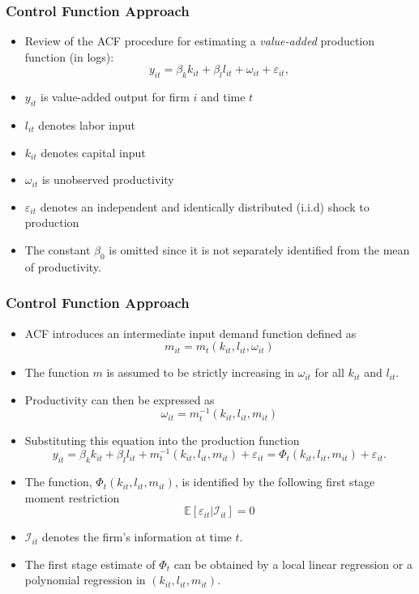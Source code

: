 \documentclass[xcolor={dvipsnames}, notheorems]{beamer}
\theoremstyle{plain}
\begin{document}

\begin{frame}
\frametitle{Control Function Approach}
\begin{itemize}
\item Review of the ACF procedure for estimating a \textit{value-added} production function (in logs):
\begin{equation}
y_{it}=\beta_{k}k_{it}+\beta_{l}l_{it}+\omega_{it}+\varepsilon_{it},
\end{equation}
\item $y_{it}$ is value-added output for firm $i$ and time $t$
\item $l_{it}$ denotes labor input
\item $k_{it}$ denotes capital input
\item $\omega_{it}$ is unobserved productivity
\item $\varepsilon_{it}$ denotes an independent and identically distributed (i.i.d)  shock to production
\item The constant $\beta_{0}$ is omitted since it is not separately identified from the mean of productivity.  
\end{itemize}
\end{frame}
\begin{frame}
\frametitle{Control Function Approach}
\begin{itemize}
\item ACF introduces an intermediate input demand function defined as
\begin{equation}
m_{it}=m_{t}(k_{it}, l_{it}, \omega_{it})
\end{equation} 
\item The function $m$ is assumed to be strictly increasing in $\omega_{it}$ for all $k_{it}$ and $l_{it}$. 
\item Productivity can then be expressed as
\begin{equation}
\omega_{it}=m_{t}^{-1}(k_{it}, l_{it}, m_{it})
\end{equation}
\item Substituting this equation into the production function
\begin{equation}
y_{it}=\beta_{k}k_{it}+\beta_{l}l_{it}+m^{-1}_{t}(k_{it}, l_{it}, m_{it})+\varepsilon_{it}=\Phi_{t}(k_{it}, l_{it}, m_{it})+\varepsilon_{it}.
\end{equation}
\item The function, $\Phi_{t}(k_{it}, l_{it}, m_{it})$, is identified by the following first stage moment restriction
\begin{equation}
\mathbb{E}[\varepsilon_{it}|\mathcal{I}_{it}]=0
\end{equation}
\item $\mathcal{I}_{it}$ denotes the firm's information at time $t$. 
\item The first stage estimate of $\Phi_{t}$ can be obtained by a local linear regression or a polynomial regression in $(k_{it}, l_{it}, m_{it}).$
\end{itemize}
\end{frame}
\end{document}
